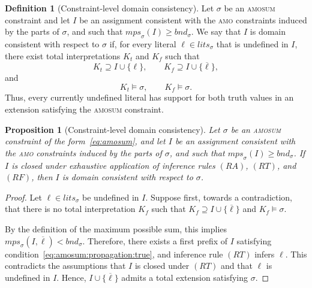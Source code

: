 \documentclass[preprint,authoryear]{elsarticle}
\newcommand{\lits}{\mathit{lits}}
\newcommand{\mps}{\mathit{mps}}
\newcommand{\bnd}{\mathit{bnd}}
\newtheorem{proposition}{Proposition}[section]
\theoremstyle{definition}
\newtheorem{definition}{Definition}[section]
\begin{document}
{\color{blue}
\begin{definition}[Constraint-level domain consistency]
Let $\sigma$ be an \textsc{amosum} constraint and let $I$ be an assignment consistent with the \textsc{amo} constraints induced by the parts of $\sigma$, and such that $\mps_\sigma(I) \geq \bnd_\sigma$.
We say that $I$ is domain consistent with respect to $\sigma$ if, for every literal $\ell \in \lits_\sigma$ that is undefined in $I$, there exist total interpretations $K_t$ and $K_f$ such that
$$
K_t \supseteq I \cup \{\ell\},
\qquad
K_f \supseteq I \cup \{\overline{\ell}\},
$$
and
$$
K_t \models \sigma,
\qquad
K_f \models \sigma.
$$
Thus, every currently undefined literal has support for both truth values in an extension satisfying the \textsc{amosum} constraint.
\end{definition}


\begin{proposition}[Constraint-level domain consistency]
Let $\sigma$ be an \textsc{amosum} constraint of the form~\eqref{eq:amosum}, and let $I$ be an assignment consistent with the \textsc{amo} constraints induced by the parts of $\sigma$, and such that $\mps_\sigma(I) \geq \bnd_\sigma$.
If $I$ is closed under exhaustive application of inference rules $(RA)$, $(RT)$, and $(RF)$, then $I$ is domain consistent with respect to $\sigma$.
\end{proposition}

\begin{proof}
Let $\ell \in \lits_\sigma$ be undefined in $I$. Suppose first, towards a contradiction, that there is no total interpretation $K_f$ such that $K_f \supseteq I \cup \{\overline{\ell}\}$ and $K_f \models \sigma$.

By the definition of the maximum possible sum, this implies $\mps_\sigma(I,\overline{\ell}) < \bnd_\sigma$.
Therefore, there exists a first prefix of $I$ satisfying condition~\eqref{eq:amosum:propagation:true}, and inference rule $(RT)$ infers $\ell$. This contradicts the assumptions that $I$ is closed under $(RT)$ and that $\ell$ is undefined in $I$. Hence, $I \cup \{\overline{\ell}\}$ admits a total extension satisfying $\sigma$.


\end{proof}}
\end{document}
